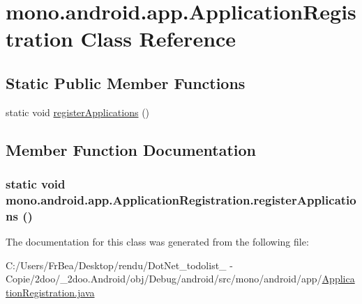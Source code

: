 \hypertarget{classmono_1_1android_1_1app_1_1_application_registration}{
\section{mono.android.app.ApplicationRegistration Class Reference}
\label{classmono_1_1android_1_1app_1_1_application_registration}
}
\subsection*{Static Public Member Functions}
\begin{CompactItemize}
\item 
static void \hyperlink{classmono_1_1android_1_1app_1_1_application_registration_a4d14d9d7a2c1c57a8ddf959fbb71e47}{registerApplications} ()
\end{CompactItemize}


\subsection{Member Function Documentation}
\hypertarget{classmono_1_1android_1_1app_1_1_application_registration_a4d14d9d7a2c1c57a8ddf959fbb71e47}{
\subsubsection[{registerApplications}]{\setlength{\rightskip}{0pt plus 5cm}static void mono.android.app.ApplicationRegistration.registerApplications ()}}
\label{classmono_1_1android_1_1app_1_1_application_registration_a4d14d9d7a2c1c57a8ddf959fbb71e47}




The documentation for this class was generated from the following file:\begin{CompactItemize}
\item 
C:/Users/FrBea/Desktop/rendu/DotNet\_\-todolist\_ - Copie/2doo/\_\-2doo.Android/obj/Debug/android/src/mono/android/app/\hyperlink{_application_registration_8java}{ApplicationRegistration.java}\end{CompactItemize}
